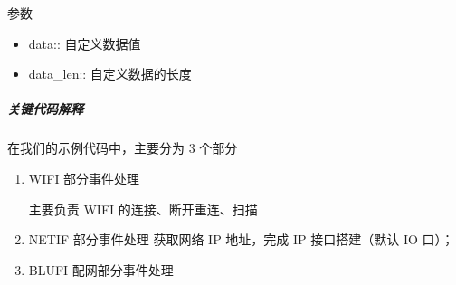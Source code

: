 \documentclass[a4paper,12pt,english]{sphinxmanual}
\begin{document}
{{\begin{itemize}
\end{itemize}

\sphinxAtStartPar
参数
\begin{itemize}
\item {} 
\sphinxAtStartPar
data:: 自定义数据值

\item {} 
\sphinxAtStartPar
data\_len:: 自定义数据的长度

\end{itemize}


\subparagraph{关键代码解释}
\label{\detokenize{exp-esp32/bluetooth/blufi:id3}}
\sphinxAtStartPar
在我们的示例代码中，主要分为 3 个部分
\begin{enumerate}
%
\item {} 
\sphinxAtStartPar
WIFI 部分事件处理

\sphinxAtStartPar
主要负责 WIFI 的连接、断开重连、扫描

\begin{sphinxVerbatim}[commandchars=\\\{\}]
\end{sphinxVerbatim}

\item {} 
\sphinxAtStartPar
NETIF 部分事件处理
获取网络 IP 地址，完成 IP 接口搭建（默认 IO 口）；

\begin{sphinxVerbatim}[commandchars=\\\{\}]
\end{sphinxVerbatim}

\item {} 
\sphinxAtStartPar
BLUFI 配网部分事件处理


\end{enumerate}}}
\end{document}
